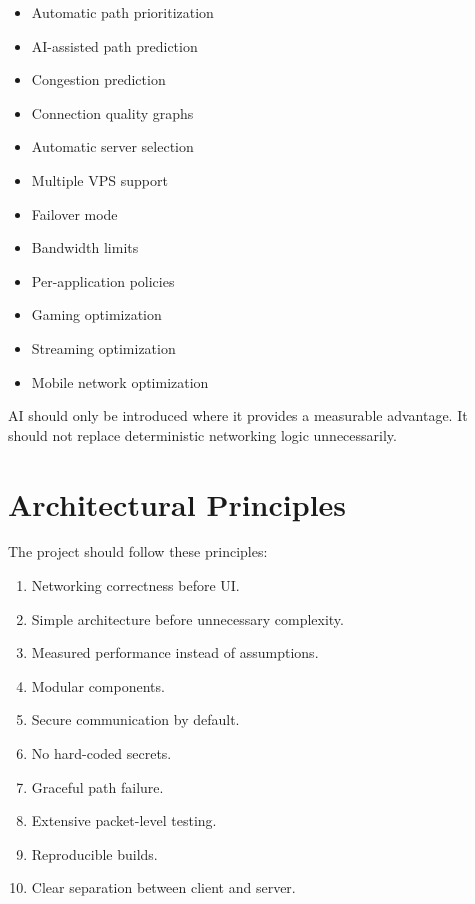 \documentclass[12pt,a4paper]{article}
\begin{document}
\begin{itemize}
    \item Automatic path prioritization
    \item AI-assisted path prediction
    \item Congestion prediction
    \item Connection quality graphs
    \item Automatic server selection
    \item Multiple VPS support
    \item Failover mode
    \item Bandwidth limits
    \item Per-application policies
    \item Gaming optimization
    \item Streaming optimization
    \item Mobile network optimization
\end{itemize}

AI should only be introduced where it provides a measurable advantage. It should not replace deterministic networking logic unnecessarily.


\section{Architectural Principles}

The project should follow these principles:

\begin{enumerate}
    \item Networking correctness before UI.
    \item Simple architecture before unnecessary complexity.
    \item Measured performance instead of assumptions.
    \item Modular components.
    \item Secure communication by default.
    \item No hard-coded secrets.
    \item Graceful path failure.
    \item Extensive packet-level testing.
    \item Reproducible builds.
    \item Clear separation between client and server.
\end{enumerate}
\end{document}
